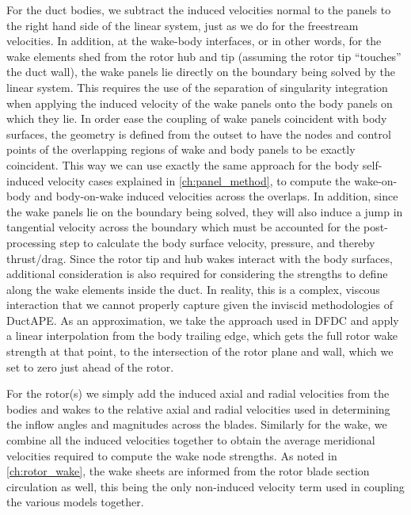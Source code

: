 For the duct bodies, we subtract the induced velocities normal to the panels to the right hand side of the linear system, just as we do for the freestream velocities.
%
In addition, at the wake-body interfaces, or in other words, for the wake elements shed from the rotor hub and tip (assuming the rotor tip ``touches'' the duct wall), the wake panels lie directly on the boundary being solved by the linear system.
%
This requires the use of the separation of singularity integration when applying the induced velocity of the wake panels onto the body panels on which they lie.
%
In order ease the coupling of wake panels coincident with body surfaces, the geometry is defined from the outset to have the nodes and control points of the overlapping regions of wake and body panels to be exactly coincident.
%
This way we can use exactly the same approach for the body self-induced velocity cases explained in \cref{ch:panel_method}, to compute the wake-on-body and body-on-wake induced velocities across the overlaps.
%
In addition, since the wake panels lie on the boundary being solved, they will also induce a jump in tangential velocity across the boundary which must be accounted for the post-processing step to calculate the body surface velocity, pressure, and thereby thrust/drag.
%
Since the rotor tip and hub wakes interact with the body surfaces, additional consideration is also required for considering the strengths to define along the wake elements inside the duct.
%
In reality, this is a complex, viscous interaction that we cannot properly capture given the inviscid methodologies of DuctAPE.
%
As an approximation, we take the approach used in DFDC and apply a linear interpolation from the body trailing edge, which gets the full rotor wake strength at that point, to the intersection of the rotor plane and wall, which we set to zero just ahead of the rotor.
%

For the rotor(s) we simply add the induced axial and radial velocities from the bodies and wakes to the relative axial and radial velocities used in determining the inflow angles and magnitudes across the blades.
%
Similarly for the wake, we combine all the induced velocities together to obtain the average meridional velocities required to compute the wake node strengths.
%
As noted in \cref{ch:rotor_wake}, the wake sheets are informed from the rotor blade section circulation as well, this being the only non-induced velocity term used in coupling the various models together.
